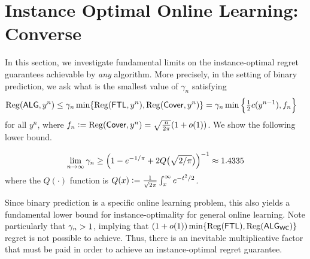 \section{Instance Optimal Online Learning: Converse} \label{sec:converse} 
In this section, we investigate fundamental limits on the instance-optimal regret guarantees achievable by \emph{any} algorithm. More precisely, in the setting of binary prediction, we ask what is the smallest value of $\gamma_n$ satisfying
\begin{align} \label{eq:LBQues}
    \mathrm{Reg}(\mathsf{ALG}, y^n) &\le \gamma_n \min\{\mathrm{Reg}(\mathsf{FTL},y^n),\mathrm{Reg}(\mathsf{Cover},y^n)\}
    = \gamma_n \min\left\{\tfrac12 c(y^{n-1}), f_n\right\}
\end{align}
for all $y^n$, where $f_n \mathrel{\mathop{:}}=  \mathrm{Reg}(\mathsf{Cover},y^n) = \sqrt{\frac{n}{2 \pi}} (1+o(1))$. 
We show the following lower bound.

\begin{theorem} \label{thm:LowerBdCR}
    \[
    \lim_{n \to \infty} \gamma_n \ge \Big(1-e^{-1/\pi}+2Q\big(\sqrt{2/\pi}\big)\Big)^{-1} \approx 1.4335
    \]
    where the $Q(\cdot)$ function is $Q(x) \mathrel{\mathop{:}}= \frac{1}{\sqrt{2\pi}}\int_{x}^{\infty} e^{-t^2/2}$. 
\end{theorem}

Since binary prediction is a specific online learning problem, this also yields a fundamental lower bound for instance-optimality for general online learning.
Note particularly that $\gamma_n > 1$, implying that $(1+o(1))\min\{\mathrm{Reg}(\mathsf{FTL}),\mathrm{Reg}(\mathsf{ALG}_{\mathsf{WC}})\}$ regret is not possible to achieve. Thus, there is an inevitable multiplicative factor that must be paid in order to achieve an instance-optimal regret guarantee.

